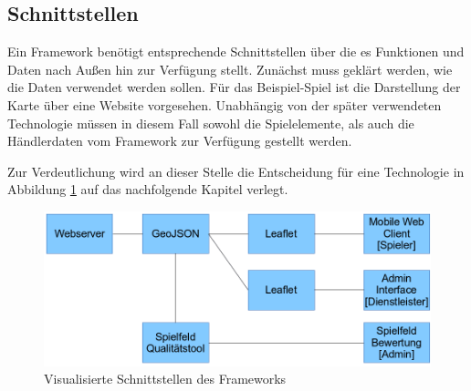 \subsection*{Schnittstellen}

Ein Framework benötigt entsprechende Schnittstellen über die es Funktionen und Daten nach Außen hin zur Verfügung stellt. Zunächst muss geklärt werden, wie die Daten verwendet werden sollen. Für das Beispiel-Spiel ist die Darstellung der Karte über eine Website vorgesehen. Unabhängig von der später verwendeten Technologie müssen in diesem Fall sowohl die Spielelemente, als auch die Händlerdaten vom Framework zur Verfügung gestellt werden.

Zur Verdeutlichung wird an dieser Stelle die Entscheidung für eine Technologie in Abbildung \ref{img:ch5_img04_interfaces} auf das nachfolgende Kapitel verlegt.

\begin{figure}[H]
\begin{center}
\includegraphics[width=140mm]{images/ch5_img04_interfaces.png}
\caption{Visualisierte Schnittstellen des Frameworks}
\label{img:ch5_img04_interfaces}
\end{center}
\end{figure}

